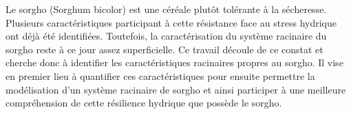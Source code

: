 Le sorgho (Sorghum bicolor) est une céréale plutôt tolérante à la sécheresse.
Plusieurs caractéristiques participant à cette résistance face au stress hydrique ont déjà été identifiées.
Toutefois, la caractérisation du système racinaire du sorgho reste à ce jour assez superficielle.
Ce travail découle de ce constat et cherche donc à identifier les caractéristiques racinaires propres au sorgho.
Il vise en premier lieu à quantifier ces caractéristiques pour ensuite permettre la modélisation d'un système racinaire de sorgho et ainsi participer à une meilleure compréhension de cette résilience hydrique que possède le sorgho.